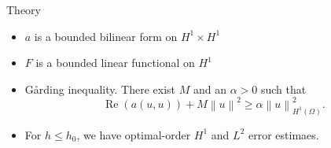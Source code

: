 \documentclass{beamer}
\begin{document}
\begin{frame}{Theory}
    \begin{itemize}
        \item<2-> $a$ is a bounded bilinear form on $H^1 \times H^1$
        \item<3-> $F$ is a bounded linear functional on $H^1$
        \item<4-> G{\aa}rding inequality. There exist $M$ and an $\alpha > 0$ such that
        \begin{equation*}
            \operatorname{Re}(a(u,u)) + M \left\| u \right\|^2 \geq \alpha \left\| u \right\|_{H^1(\Omega)}^2.
            \end{equation*}
        \item<5-> For $h \leq h_0$, we have optimal-order $H^1$ and $L^2$ error estimaes.
    \end{itemize}
\end{frame}
\end{document}
